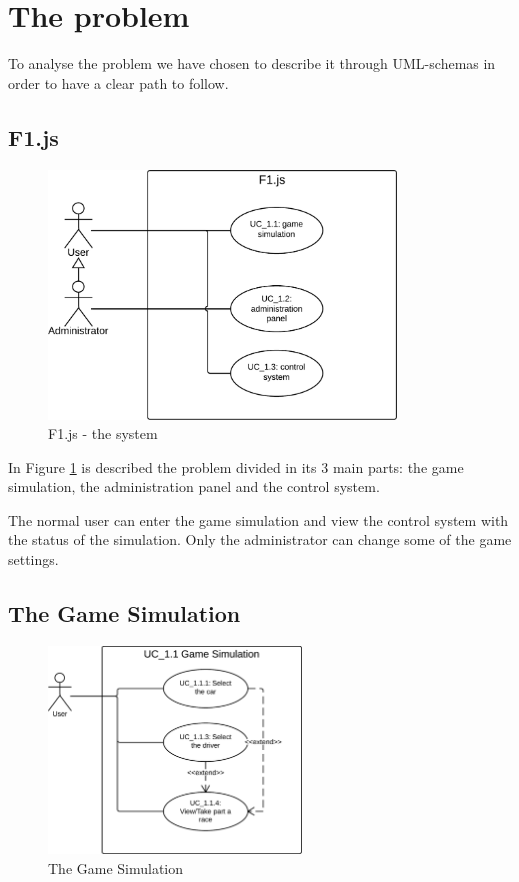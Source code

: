 \section{The problem}
\label{sec:theProblem}

To analyse the problem we have chosen to describe it through UML-schemas in order to have a clear path to follow.

\subsection{F1.js}

\begin{figure}[H]
\centering %
\includegraphics[height=250px]{./img/UML/F1Js.png}
\caption{F1.js - the system}
\label{fig:F1jsUC}
\end{figure}

In Figure \ref{fig:F1jsUC} is described the problem divided in its 3 main parts: the game simulation, the administration panel and the control system.

The normal user can enter the game simulation and view the control system with the status of the simulation. Only the administrator can change some of the game settings.

\subsection{The Game Simulation}

\begin{figure}[H]
\centering %
\includegraphics[width=0.6\textwidth]{./img/UML/GameSimulation.png}
\caption{The Game Simulation}
\label{fig:GameSimulation}
\end{figure}


